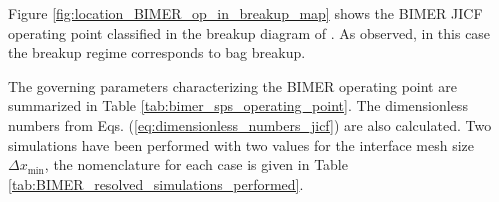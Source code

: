 
Figure \ref{fig:location_BIMER_op_in_breakup_map} shows the BIMER JICF operating point classified in the breakup diagram of \citeColor[wu_breakup_1997]. As observed, in this case the breakup regime corresponds to bag breakup.

The governing parameters characterizing the BIMER operating point are summarized in Table \ref{tab:bimer_sps_operating_point}. The dimensionless numbers from Eqs. (\ref{eq:dimensionless_numbers_jicf}) are also calculated. Two simulations have been performed with two values for the interface mesh size $\Delta x_\mathrm{min}$, the nomenclature for each case is given in Table \ref{tab:BIMER_resolved_simulations_performed}.



